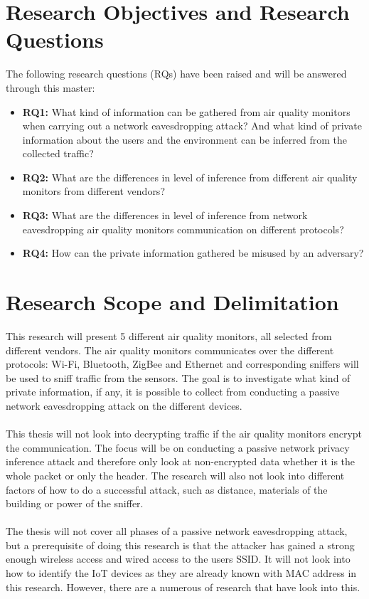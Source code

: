 \section{Research Objectives and Research Questions}

The following research questions (RQs) have been raised and will be answered through this master:
\begin{itemize}
    \item 
    \textbf{RQ1:} What kind of information can be gathered from air quality monitors when carrying out a network eavesdropping attack? And what kind of private information about the users and the environment can be inferred from the collected traffic?\\
    \item 
    \textbf{RQ2:} What are the differences in level of inference from different air quality monitors from different vendors?\\
    \item
    \textbf{RQ3:} What are the differences in level of inference from network eavesdropping air quality monitors communication on different protocols?\\
    \item 
    \textbf{RQ4:} How can the private information gathered be misused by an adversary?\\
\end{itemize}

\section{Research Scope and Delimitation}
This research will present 5 different air quality monitors, all selected from different vendors. The air quality monitors communicates over the different protocols: Wi-Fi, Bluetooth, ZigBee and Ethernet and corresponding sniffers will be used to sniff traffic from the sensors. The goal is to investigate what kind of private information, if any, it is possible to collect from conducting a passive network eavesdropping attack on the different devices. 
\\\\
This thesis will not look into decrypting traffic if the air quality monitors encrypt the communication. The focus will be on conducting a passive network privacy inference attack and therefore only look at non-encrypted data whether it is the whole packet or only the header. The research will also not look into different factors of how to do a successful attack, such as distance, materials of the building or power of the sniffer. 
\\\\ 
The thesis will not cover all phases of a passive network eavesdropping attack, but a prerequisite of doing this research is that the attacker has gained a strong enough wireless access and wired access to the users SSID. It will not look into how to identify the IoT devices as they are already known with MAC address in this research. However, there are a numerous of research that have look into this. 

